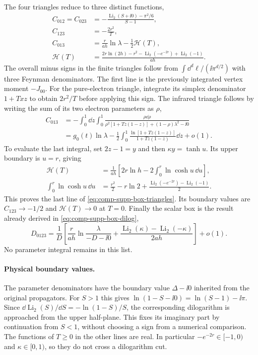 The four triangles reduce to three distinct functions,
\begin{align}
 C_{012}=C_{023}
 &=-\frac{\operatorname{Li}_2(S+\ii0)-\pi^2/6}{S-1},\\
 C_{123}&=-\frac{2r^2}{T},\\
 C_{013}&=\frac r{ah}\ln\lambda-\frac12\mathcal H(T),\\
 \mathcal H(T)&=
 \frac{2r\ln(2h)-r^2-\operatorname{Li}_2(-e^{-2r})
                        +\operatorname{Li}_2(-1)}{ah}.
 \label{eq:comp-supp-box-triangles}
\end{align}
The overall minus signs in the finite triangles follow from
$\int\dd^d\ell/(\ii\pi^{d/2})$ with three Feynman denominators.
The first line is the previously integrated vertex moment $-J_{00}$.
For the pure-electron triangle, integrate its simplex denominator
$1+T xz$ to obtain $2r^2/T$ before applying this sign.
The infrared triangle follows by writing the sum of its two
electron parameters as $\rho$,
\begin{align}
 C_{013}&=-\int_0^1\dd z\int_0^1
 \frac{\rho\dd\rho}{\rho^2[1+Tz(1-z)]+(1-\rho)\lambda^2-\ii0}\\
 &=g_0(t)\ln\lambda-\frac12\int_0^1
          \frac{\ln[1+Tz(1-z)]}{1+Tz(1-z)}\dd z+o(1).
\end{align}
To evaluate the last integral, set $2z-1=y$ and then
$\kappa y=\tanh u$. Its upper boundary is $u=r$, giving
\begin{align}
 \mathcal H(T)&=\frac1{ah}
 \left[2r\ln h-2\int_0^r\ln\cosh u\,\dd u\right],\\
 \int_0^r\ln\cosh u\,\dd u
 &=\frac{r^2}{2}-r\ln2
  +\frac{\operatorname{Li}_2(-e^{-2r})-\operatorname{Li}_2(-1)}2.
\end{align}
This proves the last line of
\eqref{eq:comp-supp-box-triangles}. Its boundary values are
$C_{123}\to-1/2$ and $\mathcal H(T)\to0$ at $T=0$.
Finally the scalar box is the result already derived in
\eqref{eq:comp-supp-box-dilog},
\begin{equation}
 D_{0123}=\frac1D\left[
 \frac r{ah}\ln\frac{\lambda}{-D-\ii0}
 +\frac{\operatorname{Li}_2(\kappa)-\operatorname{Li}_2(-\kappa)}{2ah}
 \right]+o(1).
\end{equation}
No parameter integral remains in this list.

\paragraph{Physical boundary values.}
The parameter denominators have the boundary value
$\Delta-\ii0$ inherited from the original propagators.
For $S>1$ this gives
$\ln(1-S-\ii0)=\ln(S-1)-\ii\pi$.
Since $\dd\operatorname{Li}_2(S)/\dd S=-\ln(1-S)/S$,
the corresponding dilogarithm is approached from the upper
half-plane. This fixes its imaginary part by continuation from
$S<1$, without choosing a sign from a numerical comparison.
The functions of $T\geq0$ in the other lines are real.
In particular $-e^{-2r}\in[-1,0)$ and $\kappa\in[0,1)$,
so they do not cross a dilogarithm cut.

